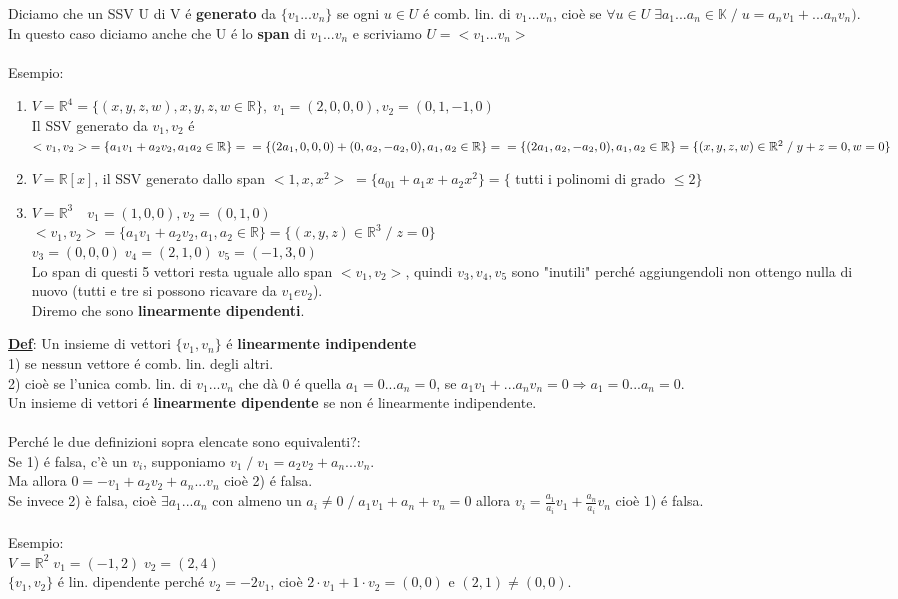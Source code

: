 \documentclass[12pt]{article}
\begin{document}
\noindent Diciamo che un SSV U di V é \textbf{generato} da $\{v_1...v_n\}$ se ogni $u\in U$ é comb. lin. di $v_1...v_n$, cioè se $\forall u \in U \; \exists a_1...a_n \in \mathbb{K} \;/\; u = a_nv_1+...a_nv_n)$. In questo caso diciamo anche che U é lo \textbf{span} di $v_1...v_n$ e scriviamo $U = <v_1...v_n>$\\\\
Esempio:
\begin{enumerate}
    \item $V = \mathbb{R}^4 = \{(x,y,z,w),x,y,z,w \in \mathbb{R}\}, \; v_1 = (2,0,0,0), v_2 = (0,1,-1,0)$\\
    Il SSV generato da $v_1, v_2$ é $<v_1,v_2> \;= \{a_1v_1+a_2v_2, a_1 a_2 \in \mathbb{R}\}= \\= \{(2a_1,0,0,0) + (0,a_2, -a_2,0), a_1,a_2 \in \mathbb{R}\} =\\= \{(2a_1,a_2,-a_2,0), a_1,a_2 \in \mathbb{R}\} = \{(x,y,z,w) \in \mathbb{R}^2\;/\; y+z = 0, w = 0\}$
    \item $V = \mathbb{R}[x]$, il SSV generato dallo span $<1,x,x^2> \; = \{a_01 + a_1x + a_2x^2\} = \{$ tutti i polinomi di grado $ \le 2\}$
    \item $V = \mathbb{R}^3 \quad v_1 = (1,0,0) , v_2 = (0,1,0)$\\
    $<v_1,v_2> = \{a_1v_1+a_2v_2, a_1,a_2 \in \mathbb{R} \} = \{(x,y,z) \in \mathbb{R}^3 \;/\; z = 0\}$\\
    $v_3 = (0,0,0)\; v_4 = (2,1,0) \; v_5 = (-1,3,0)$\\
    Lo span di questi 5 vettori resta uguale allo span $<v_1,v_2>$, quindi $v_3,v_4,v_5$ sono "inutili" perché aggiungendoli non ottengo nulla di nuovo (tutti e tre si possono ricavare da $v_1 e v_2$).\\
    Diremo che sono \textbf{linearmente dipendenti}.
\end{enumerate}
\textbf{\underline{Def}}: Un insieme di vettori $\{v_1, v_n\}$ é \textbf{linearmente indipendente}\\
1) se nessun vettore é comb. lin. degli altri.\\
2) cioè se l'unica comb. lin. di $v_1...v_n$ che dà 0 é quella $a_1 = 0... a_n = 0$, se $a_1v_1 + ... a_nv_n = 0 \Longrightarrow a_1 = 0... a_n = 0$.\\
Un insieme di vettori é \textbf{linearmente dipendente} se non é linearmente indipendente.\\\\
Perché le due definizioni sopra elencate sono equivalenti?:\\
Se 1) é falsa, c'è un $v_i$, supponiamo $v_1 \;/\; v_1 = a_2v_2 + a_n...v_n$.\\ Ma allora $0 = -v_1 + a_2v_2 + a_n...v_n$ cioè 2) é falsa.\\
Se invece 2) è falsa, cioè $\exists a_1...a_n$ con almeno un $a_i \neq 0 \;/\; a_1v_1 + a_n+v_n = 0$ allora $v_i = \frac{a_1}{a_i}v_1 + \frac{a_n}{a_i}v_n$ cioè 1) é falsa.\\\\
Esempio:\\
$V = \mathbb{R}^2\; v_1 = (-1,2) \; v_2 = (2,4)$\\
$\{v_1,v_2\}$ é lin. dipendente perché $v_2 = -2v_1$, cioè $2 \cdot v_1 + 1 \cdot v_2 = (0,0)$ e $(2,1) \neq (0,0)$.
\end{document}

